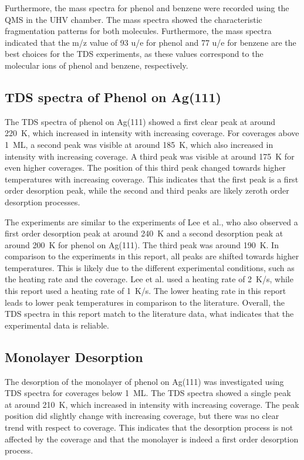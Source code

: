 \documentclass[fontsize=11pt,reqno,a4paper,oneside]{scrartcl}
\begin{document}
Furthermore, the mass spectra for phenol and benzene were recorded using the \ac{QMS} in the \ac{UHV} chamber. The mass spectra showed the characteristic fragmentation patterns for both molecules. Furthermore, the mass spectra indicated that the m/z value of 93 u/e for phenol and 77 u/e for benzene are the best choices for the \ac{TDS} experiments, as these values correspond to the molecular ions of phenol and benzene, respectively.

\subsection{TDS spectra of Phenol on Ag(111)}

The \ac{TDS} spectra of phenol on Ag(111) showed a first clear peak at around 220~K, which increased in intensity with increasing coverage. For coverages above 1~ML, a second peak was visible at around 185~K, which also increased in intensity with increasing coverage. A third peak was visible at around 175~K for even higher coverages. The position of this third peak changed towards higher temperatures with increasing coverage. This indicates that the first peak is a first order desorption peak, while the second and third peaks are likely zeroth order desorption processes.

The experiments are similar to the experiments of Lee et al.\autocite{Lee2001}, who also observed a first order desorption peak at around 240~K and a second desorption peak at around 200~K for phenol on Ag(111). The third peak was around 190~K. In comparison to the experiments in this report, all peaks are shifted towards higher temperatures. This is likely due to the different experimental conditions, such as the heating rate and the coverage. Lee et al.\autocite{Lee2001} used a heating rate of 2~K/s, while this report used a heating rate of 1~K/s. The lower heating rate in this report leads to lower peak temperatures in comparison to the literature. Overall, the \ac{TDS} spectra in this report match to the literature data\autocite{Lee2001}, what indicates that the experimental data is reliable.


\subsection{Monolayer Desorption}

The desorption of the monolayer of phenol on Ag(111) was investigated using \ac{TDS} spectra for coverages below 1~ML. The \ac{TDS} spectra showed a single peak at around 210~K, which increased in intensity with increasing coverage. The peak position did slightly change with increasing coverage, but there was no clear trend with respect to coverage. This indicates that the desorption process is not affected by the coverage and that the monolayer is indeed a first order desorption process.
\end{document}
